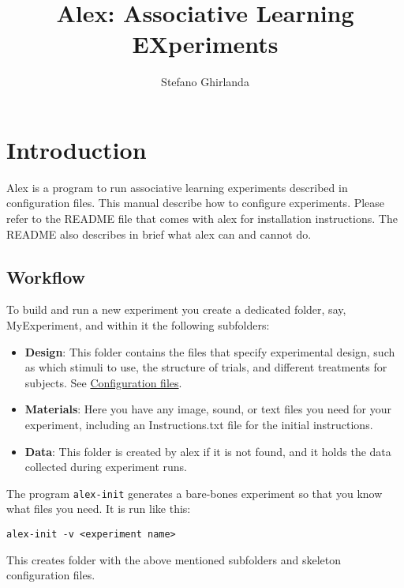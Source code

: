 \documentclass[11pt,]{article}
\title{Alex: Associative Learning EXperiments}
\author{Stefano Ghirlanda}
\date{}
\begin{document}
\maketitle

{
\hypersetup{linkcolor=black}
\setcounter{tocdepth}{3}
\begin{spacing}{0}
\small
\tableofcontents
\end{spacing}
\clearpage
}
\section{Introduction}

Alex is a program to run associative learning experiments described in
configuration files. This manual describe how to configure experiments.
Please refer to the README file that comes with alex for installation
instructions. The README also describes in brief what alex can and
cannot do.

\subsection{Workflow}

To build and run a new experiment you create a dedicated folder, say,
MyExperiment, and within it the following subfolders:

\begin{itemize}
\item
  \textbf{Design}: This folder contains the files that specify
  experimental design, such as which stimuli to use, the structure of
  trials, and different treatments for subjects. See
  \hyperref[configuration-files]{Configuration files}.
\item
  \textbf{Materials}: Here you have any image, sound, or text files you
  need for your experiment, including an Instructions.txt file for the
  initial instructions.
\item
  \textbf{Data}: This folder is created by alex if it is not found, and
  it holds the data collected during experiment runs.
\end{itemize}

The program \texttt{alex-init} generates a bare-bones experiment so that
you know what files you need. It is run like this:

\begin{verbatim}
alex-init -v <experiment name>
\end{verbatim}

This creates folder with the above mentioned subfolders and skeleton
configuration files.
\end{document}
